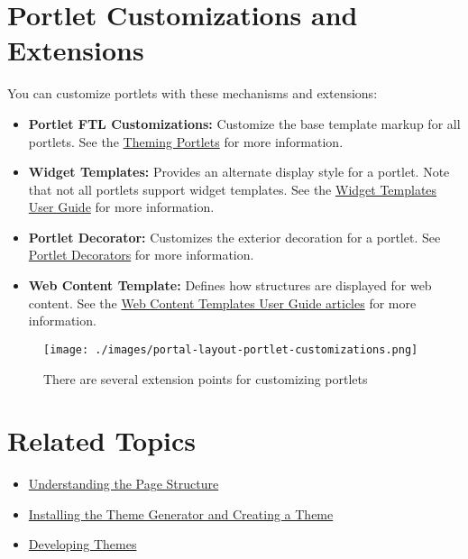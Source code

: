 \section{Portlet Customizations and
Extensions}\label{portlet-customizations-and-extensions}

You can customize portlets with these mechanisms and extensions:

\begin{itemize}
\tightlist
\item
  \textbf{Portlet FTL Customizations:} Customize the base template
  markup for all portlets. See the
  \href{/docs/7-2/frameworks/-/knowledge_base/f/theming-portlets}{Theming
  Portlets} for more information.
\item
  \textbf{Widget Templates:} Provides an alternate display style for a
  portlet. Note that not all portlets support widget templates. See the
  \href{/docs/7-2/user/-/knowledge_base/u/styling-widgets-with-widget-templates}{Widget
  Templates User Guide} for more information.
\item
  \textbf{Portlet Decorator:} Customizes the exterior decoration for a
  portlet. See
  \href{/docs/7-2/frameworks/-/knowledge_base/f/theming-portlets\#portlet-decorators}{Portlet
  Decorators} for more information.
\item
  \textbf{Web Content Template:} Defines how structures are displayed
  for web content. See the
  \href{/docs/7-2/user/-/knowledge_base/u/designing-web-content-with-templates}{Web
  Content Templates User Guide articles} for more information.
\end{itemize}

\begin{figure}
\centering
\texttt{[image: ./images/portal-layout-portlet-customizations.png]}
\caption{There are several extension points for customizing portlets}
\end{figure}

\section{Related Topics}\label{related-topics-12}

\begin{itemize}
\tightlist
\item
  \href{/docs/7-2/customization/-/knowledge_base/c/understanding-the-page-structure}{Understanding
  the Page Structure}
\item
  \href{/docs/7-2/reference/-/knowledge_base/r/installing-the-theme-generator-and-creating-a-theme}{Installing
  the Theme Generator and Creating a Theme}
\item
  \href{/docs/7-2/frameworks/-/knowledge_base/f/developing-themes}{Developing
  Themes}
\end{itemize}

